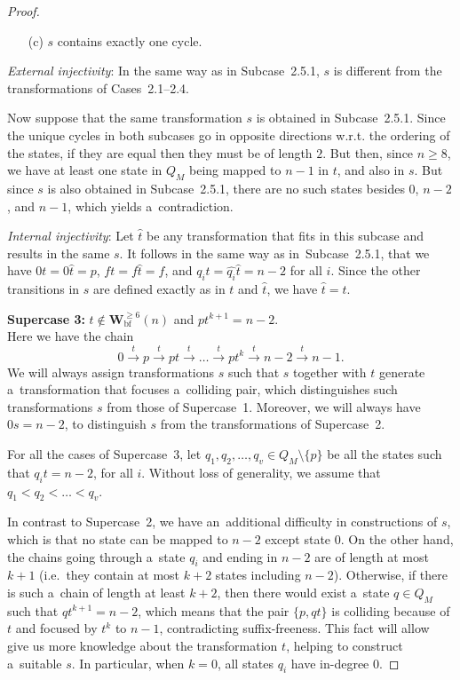 \documentclass{amsart}
\renewcommand{\ge}{\geqslant}
\newcommand{\Wbf}{\mathbf{W}^{\ge 6}_{\mathrm{bf}}}
\newcommand{\e}[1]{\hat{#1}}
\begin{document}
\begin{proof}
\begin{enumerate}
\item[(c)] $s$ contains exactly one cycle.
\end{enumerate}

\textit{External injectivity}:
In the same way as in Subcase~2.5.1, $s$ is different from the transformations of Cases~2.1--2.4.

Now suppose that the same transformation $s$ is obtained in Subcase~2.5.1.
Since the unique cycles in both subcases go in opposite directions w.r.t. the ordering of the states, if they are equal then they must be of length $2$.
But then, since $n \ge 8$, we have at least one state in $Q_M$ being mapped to $n-1$ in $t$, and also in $s$.
But since $s$ is also obtained in Subcase~2.5.1, there are no such states besides $0$, $n-2$, and $n-1$, which yields a~contradiction.

\textit{Internal injectivity}:
Let $\e{t}$ be any transformation that fits in this subcase and results in the same $s$.
It follows in the same way as in~Subcase~2.5.1, that we have $0t = 0\e{t} = p$, $ft = f\e{t} = f$, and $q_i t = \e{q_i} \e{t} = n-2$ for all $i$.
Since the other transitions in $s$ are defined exactly as in $t$ and $\e{t}$, we have $\e{t} = t$.

\textbf{Supercase 3:} $t \notin \Wbf(n)$ and $pt^{k+1} = n-2$.\\
Here we have the chain
$$0 \stackrel{t}{\rightarrow} p \stackrel{t}{\rightarrow} pt \stackrel{t}{\rightarrow} \dots \stackrel{t}{\rightarrow} pt^k \stackrel{t}{\rightarrow} n-2 \stackrel{t}{\rightarrow} n-1.$$
We will always assign transformations $s$ such that $s$ together with $t$ generate a~transformation that focuses a~colliding pair, which distinguishes such transformations $s$ from those of Supercase~1.
Moreover, we will always have $0 s = n-2$, to distinguish $s$ from the transformations of Supercase~2.

For all the cases of Supercase~3, let $q_1,q_2,\ldots,q_v \in Q_M \setminus \{p\}$ be all the states such that $q_i t = n-2$, for all $i$.
Without loss of generality, we assume that $q_1 < q_2 < \dots < q_v$.

In contrast to Supercase~2, we have an~additional difficulty in constructions of $s$, which is that no state can be mapped to $n-2$ except state $0$.
On the other hand, the chains going through a~state $q_i$ and ending in $n-2$ are of length at most $k+1$ (i.e.\ they contain at most $k+2$ states including $n-2$).
Otherwise, if there is such a~chain of length at least $k+2$, then there would exist a~state $q \in Q_M$ such that $qt^{k+1}=n-2$, which means that the pair $\{p,qt\}$ is colliding because of $t$ and focused by $t^k$ to $n-1$, contradicting suffix-freeness.
This fact will allow give us more knowledge about the transformation $t$, helping to construct a~suitable $s$.
In particular, when $k=0$, all states $q_i$ have in-degree $0$.


\end{proof}
\end{document}
